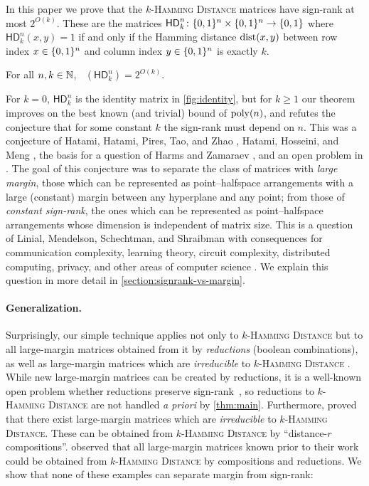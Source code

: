 \documentclass{article}
\DeclareMathOperator{\signrank}{rank_\pm}
\newcommand{\HD}[1]{\mathsf{HD}_{#1}}
\begin{document}
In this paper we prove that the
\textsc{$k$-Hamming Distance} matrices have sign-rank at most $2^{O(k)}$. These
are the matrices $\HD{k}^n\colon \zo^n \times \zo^n \to \zo$ where
$\HD{k}^n(x,y) = 1$ if and only if the Hamming distance $\operatorname{dist}(x,y)$
between row index $x \in \{0,1\}^n$ and column index $y \in \{0,1\}^n$ is exactly $k$.
\begin{boxtheorem}
\label{thm:main}
    For all $n,k\in\mathbb{N}$, $\signrank(\HD{k}^n) = 2^{O(k)}$.
\end{boxtheorem}
For $k=0$, $\HD{k}^n$ is the identity matrix in \cref{fig:identity}, but for $k
\geq 1$ our theorem improves on the best known (and trivial) bound of $\operatorname{poly}(n)$,
and refutes the conjecture that for some constant $k$ the sign-rank must depend
on $n$. This was a conjecture of Hatami, Hatami, Pires, Tao, and Zhao
\cite{HHPTZ22}, Hatami, Hosseini, and Meng \cite{HHM23}, the basis for a question
of Harms and Zamaraev \cite{HZ24}, and an open problem in
\cite{FHHH24,HH24,HR24,FGHH25}. The goal of this conjecture was to separate the
class of matrices with \emph{large margin}, \ie those which can be represented
as point--halfspace arrangements with a large (constant) margin between any
hyperplane and any point; from those of \emph{constant sign-rank}, \ie the ones
which can be represented as point--halfspace arrangements whose dimension is
independent of matrix size. This is a question of Linial, Mendelson, Schechtman,
and Shraibman \cite{LMSS07} with consequences for communication complexity,
learning theory, circuit complexity, distributed computing, privacy, and other
areas of computer science \cite{FKL+01, BES02, For02, LS09, FX14, BNS19, HWZ22,
HHPTZ22, HZ24, AN25}. We explain this question in more detail in
\cref{section:signrank-vs-margin}.

\paragraph{Generalization.}
Surprisingly, our simple technique applies not only to \textsc{$k$-Hamming
Distance} but to all large-margin matrices obtained from it by \emph{reductions} (\ie boolean combinations), as well as large-margin matrices which are
\emph{irreducible} to \textsc{$k$-Hamming Distance} \cite{FGHH25}. While new
large-margin matrices can be created by reductions, it is a well-known open
problem whether reductions preserve sign-rank~\cite{BMT21,HHPTZ22}, so
reductions to \textsc{$k$-Hamming Distance} are not handled \emph{a
priori} by \cref{thm:main}. Furthermore, \cite{FGHH25} proved that there exist
large-margin matrices which are \emph{irreducible} to \textsc{$k$-Hamming
Distance}. These can be obtained from \textsc{$k$-Hamming Distance} by
``distance-$r$ compositions''\!. \cite{FGHH25} observed that all large-margin
matrices known prior to their work could be obtained from \textsc{$k$-Hamming
Distance} by compositions and reductions. We show that none of these examples can
separate margin from sign-rank:
\end{document}
